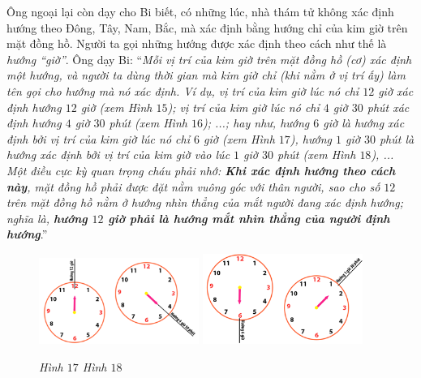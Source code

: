 	Ông ngoại lại còn dạy cho Bi biết, có những lúc, nhà thám tử không xác định hướng theo Đông, Tây, Nam, Bắc, mà xác định bằng hướng chỉ của kim giờ trên mặt đồng hồ. Người ta gọi những hướng được xác định theo cách như thế là \textit{hướng “giờ”}. Ông dạy Bi:
	\vskip 0.1cm
	“\textit{Mỗi vị trí của kim giờ trên mặt đồng hồ (cơ) xác định một hướng, và người ta dùng thời gian mà kim giờ chỉ (khi nằm ở vị trí ấy) làm tên gọi cho hướng mà nó xác định. Ví dụ, vị trí của kim giờ lúc nó chỉ $12$ giờ xác định hướng $12$ giờ (xem Hình $15$); vị trí của kim giờ lúc nó chỉ $4$ giờ $30$ phút xác định hướng $4$ giờ $30$ phút (xem Hình $16$); ...; hay như, hướng $6$ giờ là hướng xác định bởi vị trí của kim giờ lúc nó chỉ $6$ giờ (xem Hình $17$), hướng $1$ giờ $30$ phút là hướng xác định bởi vị trí của kim giờ vào lúc $1$ giờ $30$ phút (xem Hình $18$), ... Một điều cực kỳ quan trọng cháu phải nhớ: \textbf{\color{toancuabi}Khi xác định hướng theo cách này}, mặt đồng hồ phải được đặt nằm vuông góc với thân người, sao cho số $12$ trên mặt đồng hồ nằm ở hướng nhìn thẳng của mắt người đang xác định hướng; nghĩa là, \textbf{\color{toancuabi}hướng $12$ giờ phải là hướng mắt nhìn thẳng của người định hướng}}.”
		\begin{figure}[H]
		\centering
		\vspace*{4pt}
		\captionsetup{labelformat= empty, justification=centering}
		\includegraphics[width=0.465\textwidth]{pic15}
		\includegraphics[width=0.465\textwidth]{pic16}
		\caption{\small\textit{Hình $17$ \hspace*{70pt} Hình $18$}}
		\vspace*{-10pt}
	\end{figure}
